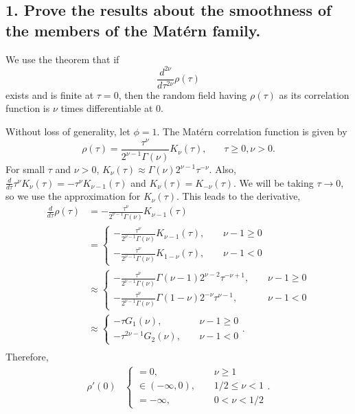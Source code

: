 \documentclass[12pt]{article}
\begin{document}
\subsection*{1. Prove the results about the smoothness of the members of the Mat{\'e}rn family.}

We use the theorem that if 
\[ \frac{d^{2\nu}}{d\tau^{2\nu}}\rho(\tau) \]
exists and is finite at $\tau=0$, then the random field having $\rho(\tau)$ as its correlation function is $\nu$ times differentiable at $0$.
\bigskip

Without loss of generality, let $\phi=1$. The Mat{\'e}rn correlation function is given by
\[ \rho(\tau) = \frac{\tau^\nu}{2^{\nu-1}\Gamma(\nu)}K_\nu(\tau),~~~~~~~~\tau\geq0,\nu>0. \]
For small $\tau$ and $\nu>0$, $K_\nu(\tau)\approx \Gamma(\nu)2^{\nu-1}\tau^{-\nu}$. Also, $\frac{d}{d\tau}\tau^\nu K_\nu(\tau)=-\tau^\nu K_{\nu-1}(\tau)$ and $K_\nu(\tau)=K_{-\nu}(\tau)$. We will be taking $\tau\rightarrow 0$, so we use the approximation for $K_\nu(\tau)$. This leads to the derivative,
\begin{align*}
\frac{d}{d\tau}\rho(\tau) &= -\frac{\tau^\nu}{2^{\nu-1}\Gamma(\nu)}K_{\nu-1}(\tau) \\
 &= \begin{cases} -\frac{\tau^\nu}{2^{\nu-1}\Gamma(\nu)}K_{\nu-1}(\tau),~~~~~&\nu-1\geq0 \\
 -\frac{\tau^\nu}{2^{\nu-1}\Gamma(\nu)}K_{1-\nu}(\tau),~~~~~&\nu-1<0 \end{cases} \\
 &\approx \begin{cases} -\frac{\tau^\nu}{2^{\nu-1}\Gamma(\nu)}\Gamma(\nu-1)2^{\nu-2}\tau^{-\nu+1},~~~~~&\nu-1\geq0 \\
 -\frac{\tau^\nu}{2^{\nu-1}\Gamma(\nu)}\Gamma(1-\nu)2^{-\nu}\tau^{\nu-1},~~~~~&\nu-1<0 \end{cases} \\
 &\approx \begin{cases} -\tau G_1(\nu),~~~~~&\nu-1\geq0 \\
 -\tau^{2\nu-1}G_2(\nu),~~~~~&\nu-1<0 \end{cases}. \\
\end{align*}
Therefore,
\begin{align*}
\rho'(0) &\begin{cases} =0,~~~~~&\nu\geq1 \\
 \in(-\infty,0),~~~~~&1/2\leq\nu<1  \\
 =-\infty,~~~~~&0<\nu<1/2 \end{cases}. \\
\end{align*}
\end{document}
